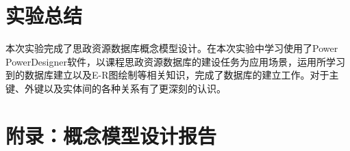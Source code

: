 \documentclass[11pt]{article}
\begin{document}
% 

% 



  \pagebreak
  \section{实验总结}
  本次实验完成了思政资源数据库概念模型设计。在本次实验中学习使用了Power PowerDesigner软件，以课程思政资源数据库的建设任务为应用场景，运用所学习到的数据库建立以及E-R图绘制等相关知识，完成了数据库的建立工作。对于主键、外键以及实体间的各种关系有了更深刻的认识。
  
  \appendix
  \lstset{
	  numbers=left,
  }
  \pagebreak
  \section{附录：概念模型设计报告}
  \label{apd:CDM}
  \begin{figure}[h]
    \centering
    
  \end{figure}
  \pagebreak
  \begin{figure}[h]
    \centering
    
  \end{figure}
\end{document}
